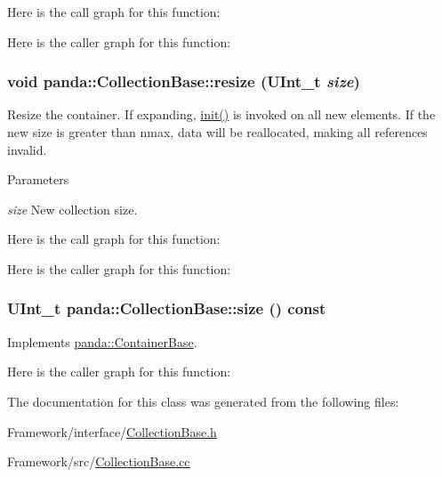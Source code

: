 Here is the call graph for this function:

Here is the caller graph for this function:\hypertarget{classpanda_1_1CollectionBase_a3ec014ac2da87bb755afbea0822621cc}{
\subsubsection[{resize}]{\setlength{\rightskip}{0pt plus 5cm}void panda::CollectionBase::resize (UInt\_\-t {\em size})}}
\label{classpanda_1_1CollectionBase_a3ec014ac2da87bb755afbea0822621cc}


Resize the container. If expanding, \hyperlink{classpanda_1_1CollectionBase_acf4c92c41e6efccc8833981c8e8725c1}{init()} is invoked on all new elements. If the new size is greater than nmax, data will be reallocated, making all references invalid.


\begin{DoxyParams}{Parameters}
\item[{\em size}]New collection size. \end{DoxyParams}


Here is the call graph for this function:

Here is the caller graph for this function:\hypertarget{classpanda_1_1CollectionBase_a341cdaab81b20671510b14476973369e}{
\subsubsection[{size}]{\setlength{\rightskip}{0pt plus 5cm}UInt\_\-t panda::CollectionBase::size () const}}
\label{classpanda_1_1CollectionBase_a341cdaab81b20671510b14476973369e}


Implements \hyperlink{classpanda_1_1ContainerBase_a4035294b020325b57cafa39fb459fd7a}{panda::ContainerBase}.

Here is the caller graph for this function:

The documentation for this class was generated from the following files:\begin{DoxyCompactItemize}
\item 
Framework/interface/\hyperlink{CollectionBase_8h}{CollectionBase.h}\item 
Framework/src/\hyperlink{CollectionBase_8cc}{CollectionBase.cc}\end{DoxyCompactItemize}
